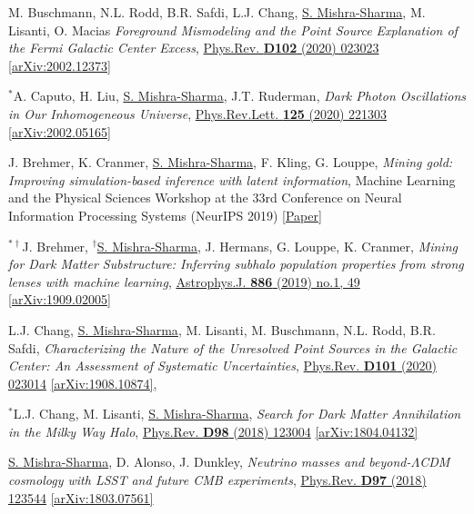 \documentclass[letterpaper,11pt]{article}
\newenvironment{packed_enumerate}[1][]{
\begin{etaremune}[#1]
  \setlength{\itemsep}{4.0pt}
  \setlength{\parskip}{0pt}
  \setlength{\parsep}{0pt}}{\end{etaremune}
}
\begin{document}
\begin{packed_enumerate}[start=56]
  \item M. Buschmann, N.L. Rodd, B.R. Safdi, L.J. Chang, \underline{S. Mishra-Sharma}, M. Lisanti, O. Macias \emph{Foreground Mismodeling and the Point Source Explanation of the Fermi Galactic Center Excess},  \href{https://journals.aps.org/prd/abstract/10.1103/PhysRevD.102.023023}{Phys.Rev. \textbf{D102} (2020) 023023} \href{https://arxiv.org/abs/2002.12373}{[arXiv:2002.12373]} 
  \item $^*$A. Caputo, H. Liu, \underline{S. Mishra-Sharma}, J.T. Ruderman, \emph{Dark Photon Oscillations in Our Inhomogeneous Universe}, \href{https://journals.aps.org/prl/abstract/10.1103/PhysRevLett.125.221303}{Phys.Rev.Lett. \textbf{125} (2020) 221303}  \href{https://arxiv.org/abs/2002.05165}{[arXiv:2002.05165]}
  \item J. Brehmer, K. Cranmer, \underline{S. Mishra-Sharma}, F. Kling, G. Louppe, \emph{Mining gold: Improving simulation-based inference with latent information}, {Machine Learning and the Physical Sciences Workshop at the 33rd Conference on Neural Information Processing Systems (NeurIPS 2019)} \href{https://ml4physicalsciences.github.io/files/NeurIPS_ML4PS_2019_16.pdf}{[Paper]}
  \item $^{*\dagger}$J. Brehmer, $^\dagger$\underline{S. Mishra-Sharma}, J. Hermans, G. Louppe, K. Cranmer, \emph{Mining for Dark Matter Substructure: Inferring subhalo population properties from strong lenses with machine learning}, \href{https://iopscience.iop.org/article/10.3847/1538-4357/ab4c41}{Astrophys.J. \textbf{886} (2019) no.1, 49} \href{https://arxiv.org/abs/1909.02005}{[arXiv:1909.02005]}
  \item L.J. Chang, \underline{S. Mishra-Sharma}, M. Lisanti, M. Buschmann, N.L. Rodd, B.R. Safdi, \emph{Characterizing the Nature of the Unresolved Point Sources in the Galactic Center: An Assessment of Systematic Uncertainties},  \href{https://journals.aps.org/prd/abstract/10.1103/PhysRevD.101.023014}{Phys.Rev. \textbf{D101} (2020) 023014} \href{https://arxiv.org/abs/1908.10874}{[arXiv:1908.10874]}, 
  \item $^*$L.J. Chang, M. Lisanti, \underline{S. Mishra-Sharma}, \emph{Search for Dark Matter Annihilation in the Milky Way Halo}, \href{https://journals.aps.org/prd/abstract/10.1103/PhysRevD.98.123004}{Phys.Rev. \textbf{D98} (2018) 123004} \href{https://arxiv.org/abs/1804.04132}{[arXiv:1804.04132]}
  \item \underline{S. Mishra-Sharma}, D. Alonso, J. Dunkley, \emph{Neutrino masses and beyond-$\Lambda$CDM cosmology with LSST and future CMB experiments}, \href{https://journals.aps.org/prd/abstract/10.1103/PhysRevD.97.123544}{Phys.Rev. \textbf{D97} (2018) 123544}  \href{https://arxiv.org/abs/1803.07561}{[arXiv:1803.07561]}

\end{packed_enumerate}
\end{document}
